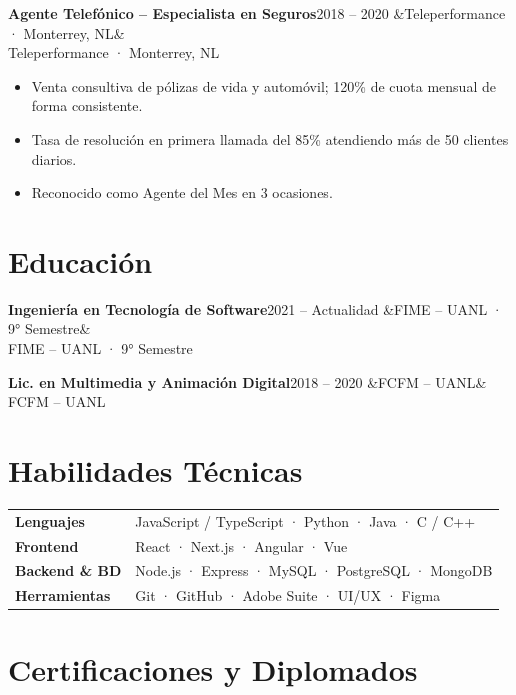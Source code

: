 \documentclass[10pt, letterpaper]{article}
\newcommand{\entry}[3]{%
  \noindent\textbf{#1}\hfill\textcolor{muted}{\small #2}%
  \ifx&#3&\else\\\textcolor{muted}{\small #3}\fi%
  \par\vspace{0.1em}%
}
\begin{document}
\vspace{0.4em}

\entry{Agente Telefónico – Especialista en Seguros}{2018 – 2020}{Teleperformance · Monterrey, NL}
\begin{itemize}
  \item Venta consultiva de pólizas de vida y automóvil; 120\% de cuota mensual de forma consistente.
  \item Tasa de resolución en primera llamada del 85\% atendiendo más de 50 clientes diarios.
  \item Reconocido como Agente del Mes en 3 ocasiones.
\end{itemize}

\section{Educación}

\entry{Ingeniería en Tecnología de Software}{2021 – Actualidad}{FIME – UANL · 9° Semestre}

\vspace{0.3em}

\entry{Lic. en Multimedia y Animación Digital}{2018 – 2020}{FCFM – UANL}

\section{Habilidades Técnicas}

\begin{tabularx}{\linewidth}{@{} l X @{}}
  \textbf{Lenguajes}      & JavaScript / TypeScript · Python · Java · C / C++ \\[0.3em]
  \textbf{Frontend}       & React · Next.js · Angular · Vue \\[0.3em]
  \textbf{Backend \& BD}  & Node.js · Express · MySQL · PostgreSQL · MongoDB \\[0.3em]
  \textbf{Herramientas}   & Git · GitHub · Adobe Suite · UI/UX · Figma \\
\end{tabularx}

\section{Certificaciones y Diplomados}
\end{document}
